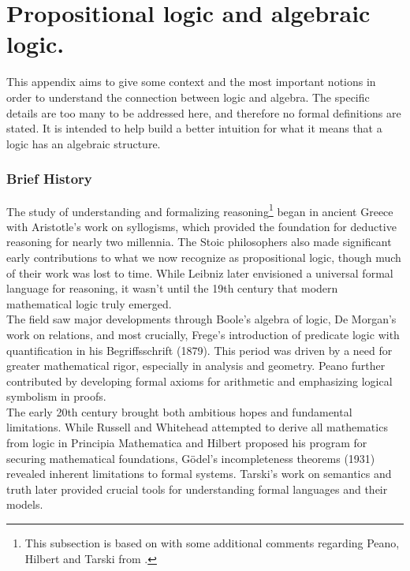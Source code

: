 \chapter{Propositional logic and algebraic logic.}

This appendix aims to give some context and the most important notions in order to understand the connection between logic and algebra. The specific details are too many to be addressed here, and therefore no formal definitions are stated. It is intended to help build a better intuition for what it means that a logic has an algebraic structure. 

\subsection*{Brief History}

The study of understanding and formalizing reasoning\footnote{This subsection is based on \cite[p.~5-8]{ConciseLogicBook} with some additional comments regarding Peano, Hilbert and Tarski from \cite{MathLogicBook}.} began in ancient Greece with Aristotle's work on syllogisms, which provided the foundation for deductive reasoning for nearly two millennia. The Stoic philosophers also made significant early contributions to what we now recognize as propositional logic, though much of their work was lost to time. While Leibniz later envisioned a universal formal language for reasoning, it wasn't until the 19th century that modern mathematical logic truly emerged.\\

The field saw major developments through Boole's algebra of logic, De Morgan's work on relations, and most crucially, Frege's introduction of predicate logic with quantification in his Begriffsschrift (1879). This period was driven by a need for greater mathematical rigor, especially in analysis and geometry. Peano further contributed by developing formal axioms for arithmetic and emphasizing logical symbolism in proofs.\\

The early 20th century brought both ambitious hopes and fundamental limitations. While Russell and Whitehead attempted to derive all mathematics from logic in Principia Mathematica and Hilbert proposed his program for securing mathematical foundations, Gödel's incompleteness theorems (1931) revealed inherent limitations to formal systems. Tarski's work on semantics and truth later provided crucial tools for understanding formal languages and their models.\\

